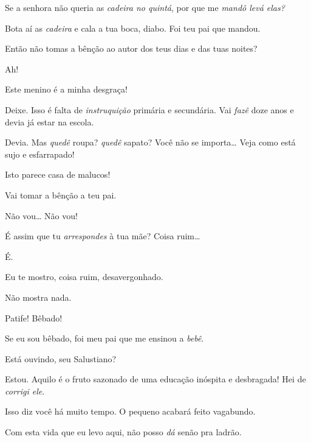   Se a senhora
não queria as \textit{cadeira no
quintá}, por que me \textit{mandô
levá elas?} 

 Bota aí as
\textit{cadeira} e cala a tua boca, diabo. Foi teu
pai que mandou.

  
Então não tomas a bênção ao autor dos teus
dias e das tuas noites?

  
Ah! 

 Este menino
é a minha desgraça!

 Deixe. Isso
é falta de \textit{instruquição} primária e
secundária. Vai \textit{fazê} doze anos e devia já
estar na escola.

 Devia. Mas
\textit{quedê} roupa? \textit{quedê}
sapato? Você não se importa\ldots{} 
 Veja como está sujo e
esfarrapado!

 Isto parece casa de
malucos!

 Vai tomar a
bênção a teu pai.

 Não vou\ldots{} Não vou!

 É assim que tu
\textit{arrespondes} à tua mãe?
Coisa ruim\ldots{}

 É.

  Eu te mostro, coisa ruim,
desavergonhado.

  Não mostra
nada.

 Patife! Bêbado!

 Se eu sou
bêbado, foi meu pai que me ensinou a
\textit{bebê}. 

 Está ouvindo,
seu Salustiano?

 Estou. Aquilo
é o fruto sazonado de uma educação inóspita
e desbragada! Hei de \textit{corrigi ele}.

 Isso diz
você há muito tempo. O pequeno acabará
feito vagabundo.

  Com esta vida que
eu levo aqui, não posso \textit{dá} senão
pra ladrão.

